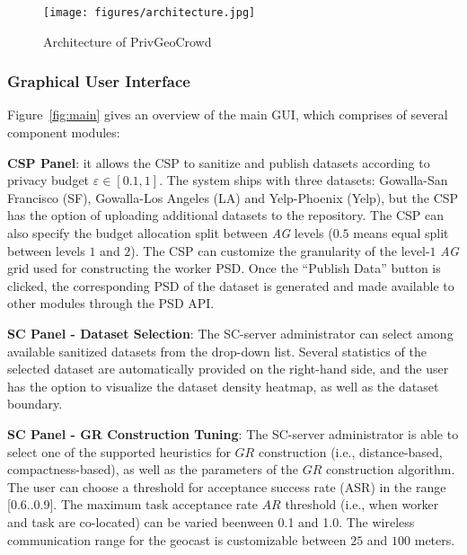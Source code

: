 \documentclass{USC-Thesis}
\numberwithin{equation}{chapter}
\begin{document}

\begin{figure}[!htb]\centering
  \texttt{[image: figures/architecture.jpg]}
  \caption{Architecture of PrivGeoCrowd}
  \label{fig:architecture}
\end{figure}

\subsubsection{Graphical User Interface}
\label{sec:gui}

Figure~\ref{fig:main} gives an overview of the main GUI, which comprises of several component modules:

\textbf{CSP Panel}: it allows the CSP to sanitize and publish datasets according to privacy budget $\varepsilon \in [0.1,1]$. The system ships with three datasets: Gowalla-San Francisco (SF), Gowalla-Los Angeles (LA) and Yelp-Phoenix (Yelp), but the CSP has the option of uploading additional datasets to the repository. The CSP can also specify the budget allocation split between {\em AG} levels ($0.5$ means equal split between levels $1$ and $2$). The CSP can customize the granularity of the level-$1$ {\em AG} grid used for constructing the worker PSD. Once the ``Publish Data'' button is clicked, the corresponding PSD of the dataset is generated and made available to other modules through the PSD API.

\textbf{SC Panel - Dataset Selection}: The SC-server administrator can select among available sanitized datasets from the drop-down list. Several statistics of the selected dataset are automatically provided on the right-hand side, and the user has the option to visualize the dataset density heatmap, as well as the dataset boundary.

\textbf{SC Panel - GR Construction Tuning}: The SC-server administrator is able to select one of the supported heuristics for $GR$ construction (i.e., distance-based, compactness-based), as well as the parameters of the $\mathit{GR}$ construction algorithm.
The user can choose a threshold for acceptance success rate (ASR) in the range [0.6..0.9]. The maximum task acceptance rate $\mathit{AR}$ threshold (i.e., when worker and task are co-located) can be varied beenween 0.1 and 1.0. The wireless communication range for the geocast is customizable between $25$ and $100$ meters. 
\end{document}
